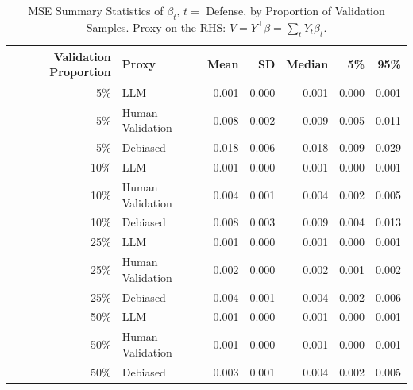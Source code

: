 \begin{table}

\caption{MSE Summary Statistics of $\beta_{t}$, $t=$ Defense, by Proportion of Validation Samples.
      Proxy on the RHS: $V = Y^\top \beta = \sum_{t} Y_t \beta_t$.}
\centering
\begin{tabular}[t]{rlrrrrr}
\toprule
Validation Proportion & Proxy & Mean & SD & Median & 5\% & 95\%\\
\midrule
5\% & LLM & 0.001 & 0.000 & 0.001 & 0.000 & 0.001\\
5\% & Human Validation & 0.008 & 0.002 & 0.009 & 0.005 & 0.011\\
5\% & Debiased & 0.018 & 0.006 & 0.018 & 0.009 & 0.029\\
10\% & LLM & 0.001 & 0.000 & 0.001 & 0.000 & 0.001\\
10\% & Human Validation & 0.004 & 0.001 & 0.004 & 0.002 & 0.005\\
10\% & Debiased & 0.008 & 0.003 & 0.009 & 0.004 & 0.013\\
25\% & LLM & 0.001 & 0.000 & 0.001 & 0.000 & 0.001\\
25\% & Human Validation & 0.002 & 0.000 & 0.002 & 0.001 & 0.002\\
25\% & Debiased & 0.004 & 0.001 & 0.004 & 0.002 & 0.006\\
50\% & LLM & 0.001 & 0.000 & 0.001 & 0.000 & 0.001\\
50\% & Human Validation & 0.001 & 0.000 & 0.001 & 0.000 & 0.001\\
50\% & Debiased & 0.003 & 0.001 & 0.004 & 0.002 & 0.005\\
\bottomrule
\end{tabular}
\end{table}
